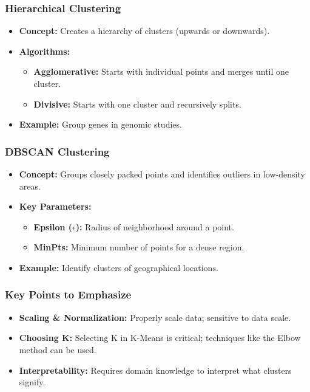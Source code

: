 \documentclass[aspectratio=169]{beamer}
\begin{document}
\begin{frame}[fragile]
    \frametitle{Hierarchical Clustering}
    \begin{itemize}
        \item \textbf{Concept:} Creates a hierarchy of clusters (upwards or downwards).
        \item \textbf{Algorithms:}
        \begin{itemize}
            \item \textbf{Agglomerative:} Starts with individual points and merges until one cluster.
            \item \textbf{Divisive:} Starts with one cluster and recursively splits.
        \end{itemize}
        \item \textbf{Example:} Group genes in genomic studies.
    \end{itemize}
\end{frame}

\begin{frame}[fragile]
    \frametitle{DBSCAN Clustering}
    \begin{itemize}
        \item \textbf{Concept:} Groups closely packed points and identifies outliers in low-density areas.
        \item \textbf{Key Parameters:}
        \begin{itemize}
            \item \textbf{Epsilon ($\epsilon$):} Radius of neighborhood around a point.
            \item \textbf{MinPts:} Minimum number of points for a dense region.
        \end{itemize}
        \item \textbf{Example:} Identify clusters of geographical locations.
    \end{itemize}
\end{frame}

\begin{frame}[fragile]
    \frametitle{Key Points to Emphasize}
    \begin{itemize}
        \item \textbf{Scaling \& Normalization:} Properly scale data; sensitive to data scale.
        \item \textbf{Choosing K:} Selecting K in K-Means is critical; techniques like the Elbow method can be used.
        \item \textbf{Interpretability:} Requires domain knowledge to interpret what clusters signify.
    \end{itemize}
\end{frame}
\end{document}
